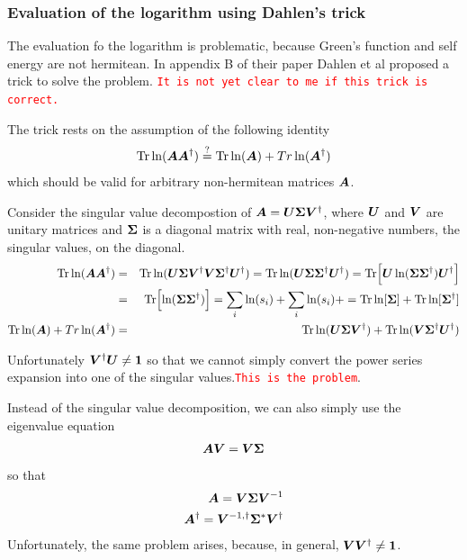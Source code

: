 \documentclass[11pt,a4paper]{report}
\newcommand{\petertt}[1]{\textcolor{red}{\texttt{#1}}}
\begin{document}
\subsubsection{Evaluation of the logarithm using Dahlen's trick}
The evaluation fo the logarithm is problematic, because Green's
function and self energy are not hermitean. In appendix B of their
paper\cite{dahlen06_pra73_12511} Dahlen et al proposed a trick to
solve the problem. \petertt{It is not yet clear to me if this trick is
  correct.}

The trick rests on the assumption of the following identity
\begin{eqnarray}
\mathrm{Tr}\ln(\bm{A}\bm{A}^\dagger)\stackrel{?}{=}
\mathrm{Tr}\ln(\bm{A})+Tr\ln(\bm{A}^\dagger)
\end{eqnarray}
which should be valid for arbitrary non-hermitean matrices $\bm{A}$.

Consider the singular value decompostion of
$\bm{A}=\bm{U}\bm{\Sigma}\bm{V}^\dagger$, where $\bm{U}$ and $\bm{V}$ are
unitary matrices and $\bm{\Sigma}$ is a diagonal matrix with real,
non-negative numbers, the singular values, on the diagonal.
\begin{eqnarray}
\mathrm{Tr}\ln(\bm{A}\bm{A}^\dagger)
&=&\mathrm{Tr}\ln(\bm{U}\bm{\Sigma}\bm{V}^\dagger
\bm{V}\bm{\Sigma}^\dagger\bm{U}^\dagger)
=\mathrm{Tr}\ln(\bm{U}\bm{\Sigma}\bm{\Sigma}^\dagger\bm{U}^\dagger)
=\mathrm{Tr}\Bigl[\bm{U}\ln(\bm{\Sigma}\bm{\Sigma}^\dagger)\bm{U}^\dagger\Bigr]
\nonumber\\
&=&\mathrm{Tr}\Bigl[\ln(\bm{\Sigma}\bm{\Sigma}^\dagger)\Bigr]
=\sum_i \ln(s_i)+\sum_i \ln(s_i)+
=\mathrm{Tr}\ln[\bm{\Sigma}]+\mathrm{Tr}\ln[\bm{\Sigma}^\dagger]
\nonumber\\
\mathrm{Tr}\ln(\bm{A})+Tr\ln(\bm{A}^\dagger)
&=&\mathrm{Tr}\ln(\bm{U}\bm{\Sigma}\bm{V}^\dagger)
+\mathrm{Tr}\ln(\bm{V}\bm{\Sigma}^\dagger\bm{U}^\dagger)
\end{eqnarray}

Unfortunately $\bm{V}^\dagger\bm{U}\neq\bm{1}$ so that we cannot
simply convert the power series expansion into one of the singular
values.\petertt{This is the problem}.


Instead of the singular value decomposition, we can also simply use the
eigenvalue equation
\begin{eqnarray}
\bm{A}\bm{V}=\bm{V}\bm{\Sigma}
\end{eqnarray}
so that
\begin{eqnarray}
\bm{A}=\bm{V}\bm{\Sigma}\bm{V}^{-1}
\nonumber\\
\bm{A}^\dagger=\bm{V}^{-1,\dagger}\bm{\Sigma}^*\bm{V}^{\dagger}
\end{eqnarray}
Unfortunately, the same problem arises, because, in general,
$\bm{V}\bm{V}^\dagger\neq\bm{1}$.
\end{document}
